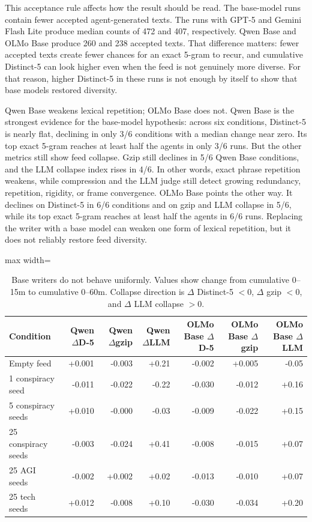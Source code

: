 \documentclass[11pt]{article}
\begin{document}
This acceptance rule affects how the result should be read. The base-model runs contain fewer accepted agent-generated texts. The runs with GPT-5 and Gemini Flash Lite produce median counts of 472 and 407, respectively. Qwen Base and OLMo Base produce 260 and 238 accepted texts. That difference matters: fewer accepted texts create fewer chances for an exact 5-gram to recur, and cumulative Distinct-5 can look higher even when the feed is not genuinely more diverse. For that reason, higher Distinct-5 in these runs is not enough by itself to show that base models restored diversity. 

Qwen Base weakens lexical repetition; OLMo Base does not. Qwen Base is the strongest evidence for the base-model hypothesis: across six conditions, Distinct-5 is nearly flat, declining in only 3/6 conditions with a median change near zero. Its top exact 5-gram reaches at least half the agents in only 3/6 runs. But the other metrics still show feed collapse. Gzip still declines in 5/6 Qwen Base conditions, and the LLM collapse index rises in 4/6. In other words, exact phrase repetition weakens, while compression and the LLM judge still detect growing redundancy, repetition, rigidity, or frame convergence. OLMo Base points the other way. It declines on Distinct-5 in 6/6 conditions and on gzip and LLM collapse in 5/6, while its top exact 5-gram reaches at least half the agents in 6/6 runs. Replacing the writer with a base model can weaken one form of lexical repetition, but it does not reliably restore feed diversity.

\begin{table}[t]
\centering
\caption{Base writers do not behave uniformly. Values show change from cumulative 0--15m to cumulative 0--60m. Collapse direction is $\Delta$ Distinct-5 $< 0$, $\Delta$ gzip $< 0$, and $\Delta$ LLM collapse $> 0$.}
\label{tab:base-writers}
\scriptsize
\begin{adjustbox}{max width=\textwidth}
\begin{tabular}{lrrrrrr}
\toprule
Condition & Qwen $\Delta$D-5 & Qwen $\Delta$gzip & Qwen $\Delta$LLM & OLMo Base $\Delta$D-5 & OLMo Base $\Delta$gzip & OLMo Base $\Delta$LLM \\
\midrule
Empty feed & +0.001 & -0.003 & +0.21 & -0.002 & +0.005 & -0.05 \\
1 conspiracy seed & -0.011 & -0.022 & -0.22 & -0.030 & -0.012 & +0.16 \\
5 conspiracy seeds & +0.010 & -0.000 & -0.03 & -0.009 & -0.022 & +0.15 \\
25 conspiracy seeds & -0.003 & -0.024 & +0.41 & -0.008 & -0.015 & +0.07 \\
25 AGI seeds & -0.002 & +0.002 & +0.02 & -0.013 & -0.010 & +0.07 \\
25 tech seeds & +0.012 & -0.008 & +0.10 & -0.030 & -0.034 & +0.20 \\
\bottomrule
\end{tabular}
\end{adjustbox}
\end{table}
\end{document}
